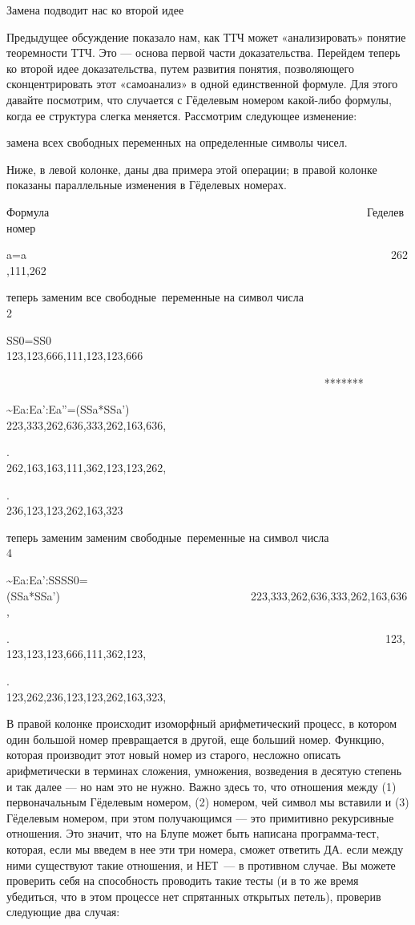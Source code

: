 \documentclass[../main.tex]{subfiles}
\begin{document}
Замена подводит нас ко второй идее

Предыдущее обсуждение показало нам, как ТТЧ может «анализировать» понятие теоремности ТТЧ. Это --- основа первой части доказательства. Перейдем теперь ко второй идее доказательства, путем развития понятия, позволяющего сконцентрировать этот «самоанализ» в одной единственной формуле. Для этого давайте посмотрим, что случается с Гёделевым номером какой-либо формулы, когда ее структура слегка меняется. Рассмотрим следующее изменение:

замена всех свободных переменных на определенные символы чисел.

Ниже, в левой колонке, даны два примера этой операции; в правой колонке показаны параллельные изменения в Гёделевых номерах.

Формула~~~~~~~~~~~~~~~~~~~~~~~~~~~~~~~~~~~~~~~~~~~~~~~~~~~~~~~~ Геделев номер

a=a~~~~~~~~~~~~~~~~~~~~~~~~~~~~~~~~~~~~~~~~~~~~~~~~~~~~~~~~~~~~~~~~~262,111,262

теперь заменим все свободные~переменные на символ числа 2~~~~~~~~~~~~~~~~~~~~~~

SS0=SS0~~~~~~~~~~~~~~~~~~~~~~~~~~~~~~~~~~~~~~~~~~~~~~~~~~~~~~~~~ 123,123,666,111,123,123,666

~~~~~~~~~~~~~~~~~~~~~~~~~~~~~~~~~~~~~~~~~~~~~~~~~~~~~~~~ *******

\textasciitilde Ea:Ea':Ea''=(SSa*SSa')~~~~~~~~~~~~~~~~~~~~~~~~~~~~~~~~~~~~~ 223,333,262,636,333,262,163,636,

.~~~~~~~~~~~~~~~~~~~~~~~~~~~~~~~~~~~~~~~~~~~~~~~~~~~~~~~~~~~~~~~~~~~ 262,163,163,111,362,123,123,262,

.~~~~~~~~~~~~~~~~~~~~~~~~~~~~~~~~~~~~~~~~~~~~~~~~~~~~~~~~~~~~~~~~~~~ 236,123,123,262,163,323

теперь заменим заменим свободные~переменные на символ числа 4~~~~~~~~~~~~~~~~~~~~~~

\textasciitilde Ea:Ea':SSSS0=(SSa*SSa')~~~~~~~~~~~~~~~~~~~~~~~~~~~~~~~~~~223,333,262,636,333,262,163,636,

.~~~~~~~~~~~~~~~~~~~~~~~~~~~~~~~~~~~~~~~~~~~~~~~~~~~~~~~~~~~~~~~~~~~123,123,123,123,666,111,362,123,

.~~~~~~~~~~~~~~~~~~~~~~~~~~~~~~~~~~~~~~~~~~~~~~~~~~~~~~~~~~~~~~~~~~ 123,262,236,123,123,262,163,323,

В правой колонке происходит изоморфный арифметический процесс, в котором один большой номер превращается в другой, еще больший номер. Функцию, которая производит этот новый номер из старого, несложно описать арифметически в терминах сложения, умножения, возведения в десятую степень и так далее --- но нам это не нужно. Важно здесь то, что отношения между (1) первоначальным Гёделевым номером, (2) номером, чей символ мы вставили и (3) Гёделевым номером, при этом получающимся --- это примитивно рекурсивные отношения. Это значит, что на Блупе может быть написана программа-тест, которая, если мы введем в нее эти три номера, сможет ответить ДА. если между ними существуют такие отношения, и НЕТ~--- в противном случае. Вы можете проверить себя на способность проводить такие тесты (и в то же время убедиться, что в этом процессе нет спрятанных открытых петель), проверив следующие два случая:
\end{document}
